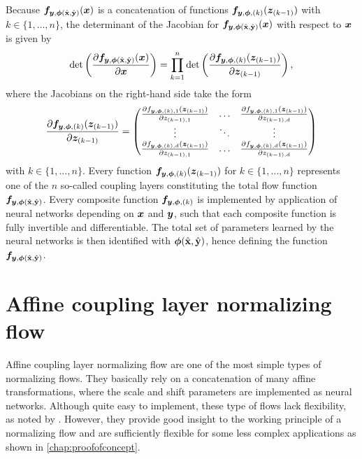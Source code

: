\documentclass[a4paper,12pt]{report}
\begin{document}
Because $\bm{f}_{\bm{y},\bm{\phi}(\hat{\boldsymbol{\mathbf{x}}},\hat{\boldsymbol{\mathbf{y}}})}(\bm{x})$ is a concatenation of functions $\bm{f}_{\bm{y},\bm{\phi},(k)}(\bm{z}_{(k-1)})$ with $k \in \{1,\dots,n\}$, the determinant of the Jacobian  for $\bm{f}_{\bm{y},\bm{\phi}(\hat{\boldsymbol{\mathbf{x}}},\hat{\boldsymbol{\mathbf{y}}})}(\bm{x})$ with respect to $\bm{x}$ is given by \begin{equation}
\det\left(\frac{\partial \bm{f}_{\bm{y},\bm{\phi}(\hat{\boldsymbol{\mathbf{x}}},\hat{\boldsymbol{\mathbf{y}}})}(\bm{x})}{\partial \bm{x}}\right) = \prod_{k=1}^{n}\det\left(\frac{\partial \bm{f}_{\bm{y},\bm{\phi},(k)}(\bm{z}_{(k-1)})}{\partial \bm{z}_{(k-1)}}\right),
\end{equation} where the Jacobians on the right-hand side take the form \begin{equation}
\frac{\partial \bm{f}_{\bm{y},\bm{\phi},(k)}(\bm{z}_{(k-1)})}{\partial \bm{z}_{(k-1)}} = 
\begin{pmatrix}
\frac{\partial f_{\bm{y},\bm{\phi},(k),1}(\bm{z}_{(k-1)})}{\partial z_{(k-1),1}} & \dots & \frac{\partial f_{\bm{y},\bm{\phi},(k),1}(\bm{z}_{(k-1)})}{\partial z_{(k-1),d}} \\
\vdots & \ddots & \vdots \\
\frac{\partial f_{\bm{y},\bm{\phi},(k),d}(\bm{z}_{(k-1)})}{\partial z_{(k-1),1}} & \dots & \frac{\partial f_{\bm{y},\bm{\phi},(k),d}(\bm{z}_{(k-1)})}{\partial z_{(k-1),d}}
\end{pmatrix}
\end{equation} with $k \in \{1,\dots,n\}$. 
Every function $\bm{f}_{\bm{y},\bm{\phi},(k)}(\bm{z}_{(k-1)})$ for $k \in \{1,\dots,n\}$ represents one of the $n$ so-called coupling layers constituting the total flow function $\bm{f}_{\bm{y},\bm{\phi}(\hat{\boldsymbol{\mathbf{x}}},\hat{\boldsymbol{\mathbf{y}}})}$. Every composite function $\bm{f}_{\bm{y},\bm{\phi},(k)}$ is implemented by application of neural networks depending on $\bm{x}$ and $\bm{y}$, such that each composite function is fully invertible and differentiable. The total set of parameters learned by the neural networks is then identified with $\bm{\phi}(\hat{\boldsymbol{\mathbf{x}}},\hat{\boldsymbol{\mathbf{y}}})$, hence defining the function $\bm{f}_{\bm{y},\bm{\phi}(\hat{\boldsymbol{\mathbf{x}}},\hat{\boldsymbol{\mathbf{y}}})}$.

\section{Affine coupling layer normalizing flow}\label{subsec:normflowsaffinecouplinglayers}
Affine coupling layer normalizing flow are one of the most simple types of normalizing flows. They basically rely on a concatenation of many affine transformations, where the scale and shift parameters are implemented as neural networks. Although quite easy to implement, these type of flows lack flexibility, as noted by \cite[p.3]{Durkan.10.06.2019}. However, they provide good insight to the working principle of a normalizing flow and are sufficiently flexible for some less complex applications as shown in \cref{chap:proofofconcept}.
 
\end{document}
